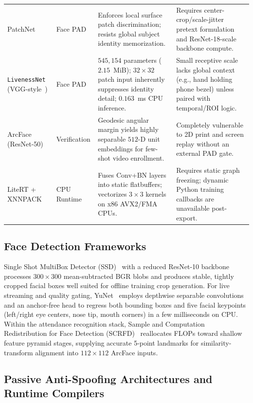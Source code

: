 \begin{table}[htbp]
\begin{tabular}{L{2.8cm}L{2.3cm}L{4.3cm}L{4.5cm}}
\addlinespace[1.5pt]
PatchNet~\cite{wang2022patchnet} & Face PAD & Enforces local surface patch discrimination; resists global subject identity memorization. & Requires center-crop/scale-jitter pretext formulation and ResNet-18-scale backbone compute. \\
\addlinespace[1.5pt]
\texttt{LivenessNet} (VGG-style~\cite{simonyan2015very}) & Face PAD & $545{,}154$ parameters ($2.15$~MiB); $32\times32$ patch input inherently suppresses identity detail; $0.163$~ms CPU inference. & Small receptive scale lacks global context (e.g., hand holding phone bezel) unless paired with temporal/ROI logic. \\
\addlinespace[1.5pt]
ArcFace (ResNet-50)~\cite{deng2019arcface} & Verification & Geodesic angular margin yields highly separable $512$-D unit embeddings for few-shot video enrollment. & Completely vulnerable to 2D print and screen replay without an external PAD gate. \\
\addlinespace[1.5pt]
LiteRT + XNNPACK~\cite{david2021tensorflow} & CPU Runtime & Fuses Conv+BN layers into static flatbuffers; vectorizes $3\times3$ kernels on x86 AVX2/FMA CPUs. & Requires static graph freezing; dynamic Python training callbacks are unavailable post-export. \\
\bottomrule
\end{tabular}
\end{table}

\subsection{Face Detection Frameworks}

Single Shot MultiBox Detector (SSD)~\cite{liu2016ssd} with a reduced ResNet-10 backbone processes $300\times300$ mean-subtracted BGR blobs and produces stable, tightly cropped facial boxes well suited for offline training crop generation. For live streaming and quality gating, YuNet~\cite{wu2023yunet} employs depthwise separable convolutions and an anchor-free head to regress both bounding boxes and five facial keypoints (left/right eye centers, nose tip, mouth corners) in a few milliseconds on CPU. Within the attendance recognition stack, Sample and Computation Redistribution for Face Detection (SCRFD)~\cite{guo2022scrfd} reallocates FLOPs toward shallow feature pyramid stages, supplying accurate 5-point landmarks for similarity-transform alignment into $112\times112$ ArcFace inputs.

\subsection{Passive Anti-Spoofing Architectures and Runtime Compilers}

